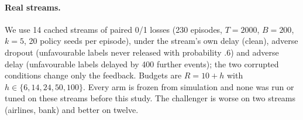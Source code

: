 \documentclass{article}
\theoremstyle{plain}
\theoremstyle{definition}
\begin{document}
\paragraph{Real streams.}
We use 14 cached streams of paired 0/1 losses (230 episodes, $T=2000$, $B=200$, $k=5$, 20 policy seeds per episode), under the stream's own delay (clean), adverse dropout (unfavourable labels never released with probability $.6$) and adverse delay (unfavourable labels delayed by 400 further events); the two corrupted conditions change only the feedback. Budgets are $R=10+h$ with $h\in\{6,14,24,50,100\}$. Every arm is frozen from simulation and none was run or tuned on these streams before this study. The challenger is worse on two streams (airlines, bank) and better on twelve.

\begin{table}[t]
\caption{Registered confirmation C1--C6 (simulation, \NRunsPerArm{} runs per arm). Source: \texttt{confirm\_summary.json}.}\label{tab:confirm}
\centering\small

\end{table}

\begin{table}[t]
\caption{Simulation, $R=20$, pooled over \NRegimes{} regimes. $J$ is mean cost; ``vs never'' is the relative difference in $J$; harm quantiles are of $\sup_tH_t$. The last two columns give the exceedance rate of $R=20$ pooled and in the worst regime. The two shields keep the budget; the comparators do not.}\label{tab:sim}
\centering\scriptsize

\end{table}
\end{document}
